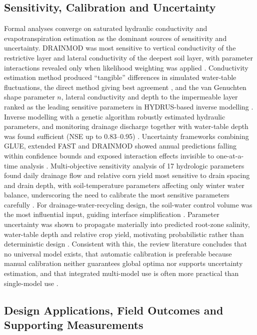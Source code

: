 \subsection{Sensitivity, Calibration and Uncertainty}

Formal analyses converge on saturated hydraulic conductivity and evapotranspiration estimation as the dominant sources of sensitivity and uncertainty. \textsc{DRAINMOD} was most sensitive to vertical conductivity of the restrictive layer and lateral conductivity of the deepest soil layer, with parameter interactions revealed only when likelihood weighting was applied \parencite{Wang2006}. Conductivity estimation method produced ``tangible'' differences in simulated water-table fluctuations, the direct method giving best agreement \parencite{NabiSichani2012}, and the van Genuchten shape parameter $n$, lateral conductivity and depth to the impermeable layer ranked as the leading sensitive parameters in HYDRUS-based inverse modelling \parencite{Sedaghatdoost2018}. Inverse modelling with a genetic algorithm robustly estimated hydraulic parameters, and monitoring drainage discharge together with water-table depth was found sufficient (NSE up to 0.83--0.95) \parencite{Sedaghatdoost2018}. Uncertainty frameworks combining GLUE, extended FAST and \textsc{DRAINMOD} showed annual predictions falling within confidence bounds and exposed interaction effects invisible to one-at-a-time analysis \parencite{Wang2006}. Multi-objective sensitivity analysis of 17 hydrologic parameters found daily drainage flow and relative corn yield most sensitive to drain spacing and drain depth, with soil-temperature parameters affecting only winter water balance, underscoring the need to calibrate the most sensitive parameters carefully \parencite{Timalsina2023}. For drainage-water-recycling design, the soil-water control volume was the most influential input, guiding interface simplification \parencite{Reinhart2020}. Parameter uncertainty was shown to propagate materially into predicted root-zone salinity, water-table depth and relative crop yield, motivating probabilistic rather than deterministic design \parencite{Alzraiee2013,Alzraiee2013b}. Consistent with this, the review literature concludes that no universal model exists, that automatic calibration is preferable because manual calibration neither guarantees global optima nor supports uncertainty estimation, and that integrated multi-model use is often more practical than single-model use \parencite{Singh2019b}.

\subsection{Design Applications, Field Outcomes and Supporting Measurements}

